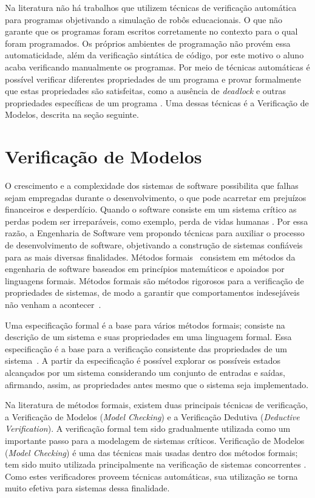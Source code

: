 Na literatura não há trabalhos que utilizem técnicas de verificação automática para programas objetivando a simulação de robôs educacionais. O que não garante que os programas foram escritos corretamente no contexto para o qual foram programados. Os próprios ambientes de programação não provém essa automaticidade, além da verificação sintática de código, por este motivo o aluno acaba verificando manualmente os programas. Por meio de técnicas automáticas é possível verificar diferentes propriedades de um programa e provar formalmente que estas propriedades são satisfeitas, como a ausência de \textit{deadlock} e outras propriedades específicas de um programa \cite{miyazawa}. Uma dessas técnicas é a Verificação de Modelos, descrita na seção seguinte.

\section{Verificação de Modelos}
\label{sec:verificacao}
O crescimento e a complexidade dos sistemas de software possibilita que falhas sejam empregadas durante o desenvolvimento, o que pode acarretar em prejuízos financeiros e desperdício. Quando o software consiste em um sistema crítico as perdas podem ser irreparáveis, como exemplo, perda de vidas humanas \cite{Clarke:1996}. Por essa razão, a Engenharia de Software vem propondo técnicas para auxiliar o processo de desenvolvimento de software, objetivando a construção de sistemas confiáveis para as mais diversas finalidades. Métodos formais~\cite{rui_silva} consistem em métodos da engenharia de software baseados em princípios matemáticos e apoiados por linguagens formais. Métodos formais são métodos rigorosos para a verificação de propriedades de sistemas, de modo a garantir que comportamentos indesejáveis não venham a acontecer~\cite{bhatt}.

Uma especificação formal é a base para vários métodos formais; consiste na descrição de um sistema e suas propriedades em uma linguagem formal. Essa especificação é a base para a verificação consistente das propriedades de um sistema~\cite{gannon,rui_silva}. A partir da especificação é possível explorar os possíveis estados alcançados por um sistema considerando um conjunto de entradas e saídas, afirmando, assim, as propriedades antes mesmo que o sistema seja implementado.

Na literatura de métodos formais, existem duas principais técnicas de verificação, a Verificação de Modelos (\textit{Model Checking}) e a Verificação Dedutiva (\textit{Deductive Verification}). A verificação formal tem sido gradualmente utilizada como um importante passo para a modelagem de sistemas críticos. Verificação de Modelos (\textit{Model Checking}) é uma das técnicas mais usadas dentro dos métodos formais; tem sido muito utilizada principalmente na verificação de sistemas concorrentes \cite{ZHAO2014}. Como estes verificadores proveem técnicas automáticas, sua utilização se torna muito efetiva para sistemas dessa finalidade.

